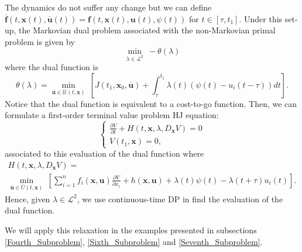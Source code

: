 \begin{example}
The dynamics do not suffer any change but we can define $\overline{\bm{f}}(t,\bm{x}(t),\overline{\bm{u}}(t))=\bm{f}(t,\bm{x}(t),\bm{u}(t),\psi(t))$ for $t\in[\tau,t_1]$. 
Under this set-up, the Markovian dual problem associated with the non-Markovian 
primal problem is given by
\begin{equation}
\min_{\lambda\in\mathcal{L}^2}\ -\theta(\lambda)
\label{Eg2DP}
\end{equation}
where the dual function is
\begin{equation}
\theta(\lambda)=\min_{\overline{\bm{u}}\in\overline{\mathcal{U}}(t,\bm{x})}\ \left[J(t_1,\bm{x}_0,\overline{\bm{u}})+\int_{\tau}^{t_1}\lambda(t)\left(\psi(t)-u_i(t-\tau)\right)dt\right].
\label{Eg2DF}
\end{equation}
Notice that the dual function is equivalent to a cost-to-go function. Then, we can formulate a first-order terminal value problem HJ equation:
\begin{equation}
\begin{cases}
\frac{\partial V}{\partial t}+H(t,\bm{x},\lambda,D_{\bm{x}}V)=0\\
V(t_1,\bm{x})=0,
\end{cases}
\label{Eg2HJB}
\end{equation}
associated to this evaluation of the dual function
where
\begin{multline}
H(t,\bm{x},\lambda,D_{\bm{x}}V)=\\
\min_{\bm{\overline{u}}\in \overline{U}(t,\bm{x})}\ \left[\sum_{i=1}^nf_i(\bm{x},\bm{u})\frac{\partial V}{\partial x_i}+h(\bm{x},\bm{u})+\lambda(t)\psi(t)-\lambda(t+\tau)u_i(t)\right].
\end{multline}
Hence, given $\lambda\in\mathcal{L}^2$, we use continuous-time DP in find the evaluation of the dual function.
\end{example}

We will apply this relaxation in the examples presented in subsections \ref{Fourth_Subproblem}, \ref{Sixth_Subproblem} 
and \ref{Seventh_Subproblem}.\\
\\

